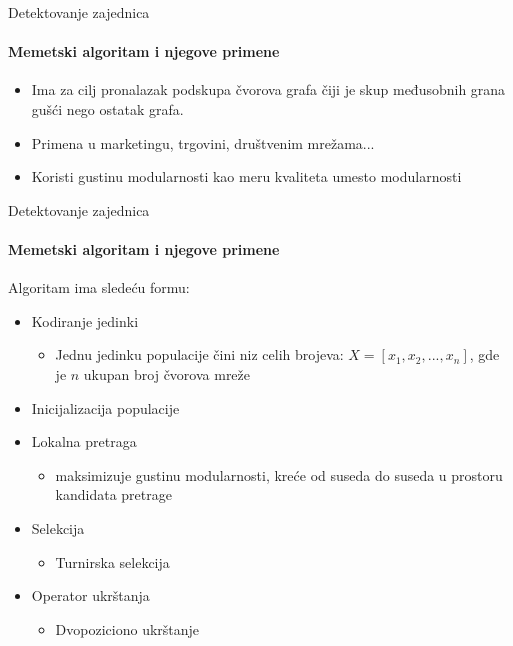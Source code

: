 \documentclass{beamer}
\begin{document}
\begin{frame}[fragile]{Detektovanje zajednica}
  \framesubtitle{Memetski algoritam i njegove primene}
 
  \begin{itemize}
   \item 
   Ima za cilj pronalazak  podskupa čvorova grafa čiji je skup međusobnih grana gušći nego ostatak grafa.
    \end{itemize}
    
    
      \begin{itemize}
   \item Primena u marketingu, trgovini, društvenim mrežama...
    \end{itemize}
    
    \begin{itemize}
   \item Koristi gustinu modularnosti kao meru kvaliteta umesto modularnosti
    \end{itemize}
    \end{frame}
    
\begin{frame}[fragile]{Detektovanje zajednica}
  \framesubtitle{Memetski algoritam i njegove primene}
    Algoritam ima sledeću formu:
    
       \begin{itemize}
   \item{Kodiranje jedinki}
        \begin{itemize}
             \item Jednu jedinku populacije čini niz celih brojeva: $X = [x_1, x_2,...,x_n]$, gde je $n$ ukupan broj čvorova mreže
    \end{itemize}
    \item{Inicijalizacija populacije}
    \item{Lokalna pretraga}
    \begin{itemize}
        \item maksimizuje gustinu modularnosti, kreće od suseda do suseda u prostoru kandidata pretrage
    \end{itemize}
    \item{Selekcija}
        \begin{itemize}
        \item Turnirska selekcija
    \end{itemize}
    \item{Operator ukrštanja}
        \begin{itemize}
            \item Dvopoziciono ukrštanje
        \end{itemize}

  \end{itemize}

\end{frame}
\end{document}
